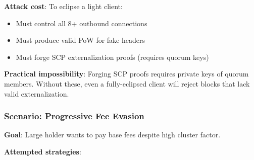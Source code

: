 \textbf{Attack cost}: To eclipse a light client:
\begin{itemize}
  \item Must control all 8+ outbound connections
  \item Must produce valid PoW for fake headers
  \item Must forge SCP externalization proofs (requires quorum keys)
\end{itemize}

\textbf{Practical impossibility}: Forging SCP proofs requires private keys
of quorum members. Without these, even a fully-eclipsed client will reject
blocks that lack valid externalization.

\subsubsection{Scenario: Progressive Fee Evasion}

\textbf{Goal}: Large holder wants to pay base fees despite high cluster
factor.

\textbf{Attempted strategies}:

